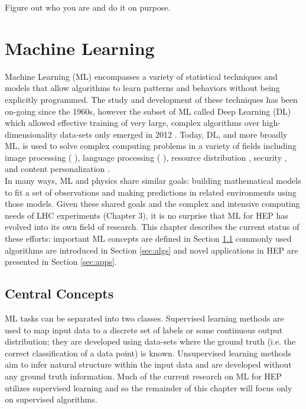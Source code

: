 \begin{savequote}[75mm]
Figure out who you are and do it on purpose.
\end{savequote}

\chapter{Machine Learning}

Machine Learning (ML) encompasses a variety of statistical techniques and models that allow algorithms to learn patterns and behaviors without being explicitly programmed. The study and development of these techniques has been on-going since the 1960s, however the subset of ML called Deep Learning (DL) which allowed effective training of very large, complex algorithms over high-dimensionality data-sets only emerged in 2012 \cite{nips_2012}. Today, DL, and more broadly ML, is used to solve complex computing problems in a variety of fields including image processing (\cite{medical_img} \cite{img_cap}), language processing (\cite{nlp1} \cite{nlp2}), resource distribution \cite{resource_dist}, security \cite{security1}, and content personalization \cite{personalization}.\\

In many ways, ML and physics share similar goals: building mathematical models to fit a set of observations and making predictions in related environments using those models. Given these shared goals and the complex and intensive computing needs of LHC experiments (Chapter 3), it is no surprise that ML for HEP has evolved into its own field of research. This chapter describes the current status of these efforts: important ML concepts are defined in Section \ref{sec:concepts} commonly used algorithms are introduced in Section \ref{sec:algs} and novel applications in HEP are presented in Section \ref{sec:apps}.\\

\section{Central Concepts}\label{sec:concepts}
ML tasks can be separated into two classes. Supervised learning methods are used to map input data to a discrete set of labels or some continuous output distribution; they are developed using data-sets where the ground truth (i.e. the correct classification of a data point) is known. Unsupervised learning methods aim to infer natural structure within the input data and are developed without any ground truth information. Much of the current research on ML for HEP utilizes supervised learning and so the remainder of this chapter will focus only on supervised algorithms.\\

